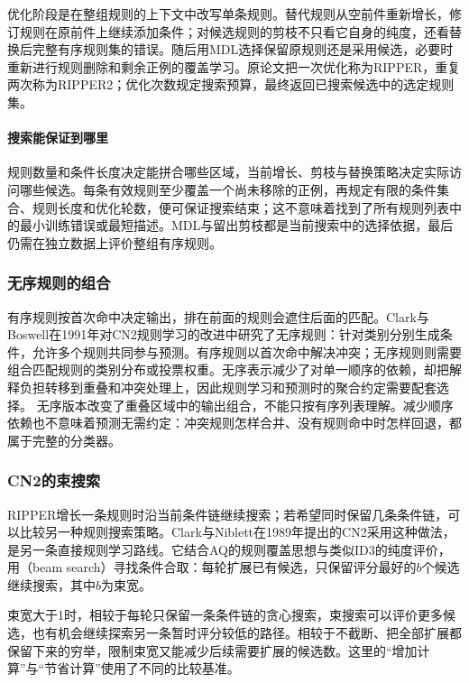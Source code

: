 优化阶段是在整组规则的上下文中改写单条规则。替代规则从空前件重新增长，修订规则在原前件上继续添加条件；对候选规则的剪枝不只看它自身的纯度，还看替换后完整有序规则集的错误。随后用MDL选择保留原规则还是采用候选，必要时重新进行规则删除和剩余正例的覆盖学习。原论文把一次优化称为RIPPER，重复两次称为RIPPER2；优化次数规定搜索预算，最终返回已搜索候选中的选定规则集。

\paragraph{搜索能保证到哪里}
\label{sec:classification-ripper-theory}
规则数量和条件长度决定能拼合哪些区域，当前增长、剪枝与替换策略决定实际访问哪些候选。每条有效规则至少覆盖一个尚未移除的正例，再规定有限的条件集合、规则长度和优化轮数，便可保证搜索结束；这不意味着找到了所有规则列表中的最小训练错误或最短描述。MDL与留出剪枝都是当前搜索中的选择依据，最后仍需在独立数据上评价整组有序规则。

\subsubsection{无序规则的组合}

有序规则按首次命中决定输出，排在前面的规则会遮住后面的匹配。Clark与Boswell在1991年对CN2规则学习的改进中研究了无序规则：针对类别分别生成条件，允许多个规则共同参与预测。有序规则以首次命中解决冲突；无序规则则需要组合匹配规则的类别分布或投票权重。无序表示减少了对单一顺序的依赖，却把解释负担转移到重叠和冲突处理上，因此规则学习和预测时的聚合约定需要配套选择。
无序版本改变了重叠区域中的输出组合，不能只按有序列表理解。减少顺序依赖也不意味着预测无需约定：冲突规则怎样合并、没有规则命中时怎样回退，都属于完整的分类器。

\subsubsection{CN2的束搜索}

RIPPER增长一条规则时沿当前条件链继续搜索；若希望同时保留几条条件链，可以比较另一种规则搜索策略。Clark与Niblett在1989年提出的CN2采用这种做法，是另一条直接规则学习路线。它结合AQ的规则覆盖思想与类似ID3的纯度评价，用（beam search）寻找条件合取：每轮扩展已有候选，只保留评分最好的$b$个候选继续搜索，其中$b$为束宽。

束宽大于1时，相较于每轮只保留一条条件链的贪心搜索，束搜索可以评价更多候选，也有机会继续探索另一条暂时评分较低的路径。相较于不截断、把全部扩展都保留下来的穷举，限制束宽又能减少后续需要扩展的候选数。这里的“增加计算”与“节省计算”使用了不同的比较基准。

